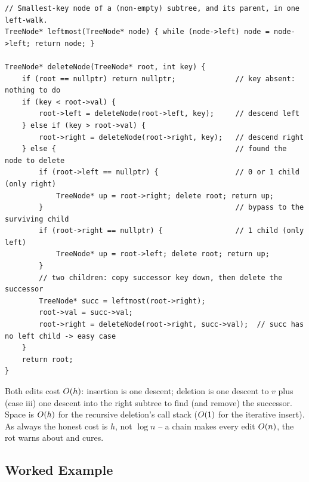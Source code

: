 \begin{lstlisting}[caption={Delete a key from a BST -- the three cases with successor splice (LeetCode 450)}, label={lst:c05-delcode}]
// Smallest-key node of a (non-empty) subtree, and its parent, in one left-walk.
TreeNode* leftmost(TreeNode* node) { while (node->left) node = node->left; return node; }

TreeNode* deleteNode(TreeNode* root, int key) {
    if (root == nullptr) return nullptr;              // key absent: nothing to do
    if (key < root->val) {
        root->left = deleteNode(root->left, key);     // descend left
    } else if (key > root->val) {
        root->right = deleteNode(root->right, key);   // descend right
    } else {                                          // found the node to delete
        if (root->left == nullptr) {                  // 0 or 1 child (only right)
            TreeNode* up = root->right; delete root; return up;
        }                                             // bypass to the surviving child
        if (root->right == nullptr) {                 // 1 child (only left)
            TreeNode* up = root->left; delete root; return up;
        }
        // two children: copy successor key down, then delete the successor
        TreeNode* succ = leftmost(root->right);
        root->val = succ->val;
        root->right = deleteNode(root->right, succ->val);  // succ has no left child -> easy case
    }
    return root;
}
\end{lstlisting}
\begin{complexitybox}
Both edits cost $O(h)$: insertion is one descent; deletion is one descent to $v$ plus (case iii)
one descent into the right subtree to find (and remove) the successor. Space is $O(h)$ for the
recursive deletion's call stack ($O(1)$ for the iterative insert). As always the honest cost is
$h$, not $\log n$ -- a chain makes every edit $O(n)$, the rot  warns about
and  cures.
\end{complexitybox}

\subsection{Worked Example}

